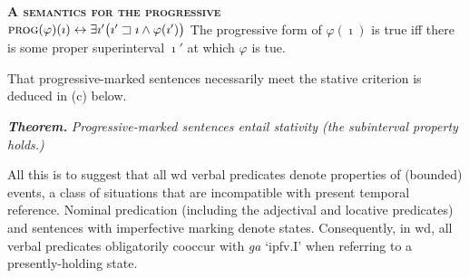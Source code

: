 \a\textbf{\textsc{A semantics for the progressive}}\\
$  \textsc{prog}(\varphi)(\imath)\leftrightarrow\exists \imath'\big(\imath'\sqsupset\imath \wedge\varphi(\imath')\big)$
The progressive form of $ \varphi(\imath) $ is true iff there is some proper superinterval $ \imath' $ at which $ \varphi $ is tue.
\xe

\noindent That progressive-marked sentences necessarily meet the stative criterion is deduced in (c) below.


\pex[exno=\getref{AspClForm}]\a[label=c.]\textbf{\textit{Theorem.}} \textit{Progressive-marked sentences entail stativity (the subinterval property holds.)}\\
\xe

All this is to suggest that all \acrshort{wd} verbal predicates denote properties of (bounded) events, a class of situations that are incompatible with present temporal reference. Nominal predication (including the adjectival and locative predicates) and sentences with imperfective marking denote states. Consequently, in \gls{wd}, all verbal predicates obligatorily cooccur with \textit{ga} `\gls{ipfv}.\gls{I}' when referring to a presently-holding state. 


